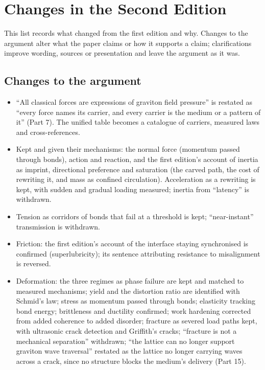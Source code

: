 \documentclass[11pt,a4paper]{article}
\begin{document}
\clearpage
\section*{Changes in the Second Edition}

This list records what changed from the first edition and why. Changes to the argument alter what the paper claims or how it supports a claim; clarifications improve wording, sources or presentation and leave the argument as it was.

\subsection*{Changes to the argument}
\begin{itemize}
\item ``All classical forces are expressions of graviton field pressure'' is restated as ``every force names its carrier, and every carrier is the medium or a pattern of it'' (Part 7). The unified table becomes a catalogue of carriers, measured laws and cross-references.
\item Kept and given their mechanisms: the normal force (momentum passed through bonds), action and reaction, and the first edition's account of inertia as imprint, directional preference and saturation (the carved path, the cost of rewriting it, and mass as confined circulation). Acceleration as a rewriting is kept, with sudden and gradual loading measured; inertia from ``latency'' is withdrawn.
\item Tension as corridors of bonds that fail at a threshold is kept; ``near-instant'' transmission is withdrawn.
\item Friction: the first edition's account of the interface staying synchronised is confirmed (superlubricity); its sentence attributing resistance to misalignment is reversed.
\item Deformation: the three regimes as phase failure are kept and matched to measured mechanisms; yield and the distortion ratio are identified with Schmid's law; stress as momentum passed through bonds; elasticity tracking bond energy; brittleness and ductility confirmed; work hardening corrected from added coherence to added disorder; fracture as severed load paths kept, with ultrasonic crack detection and Griffith's cracks; ``fracture is not a mechanical separation'' withdrawn; ``the lattice can no longer support graviton wave traversal'' restated as the lattice no longer carrying waves across a crack, since no structure blocks the medium's delivery (Part 15).

\end{itemize}
\end{document}
